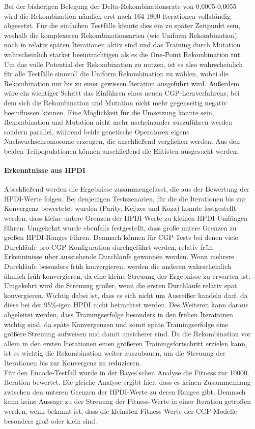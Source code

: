 Bei der bisherigen Belegung der Delta-Rekombinationsrate von 0,0005-0,0055 wird die Rekombination nämlich erst nach 164-1800 Iterationen vollständig abgesetzt.
Für die einfachen Testfälle könnte dies ein zu später Zeitpunkt sein, weshalb die komplexeren Rekombinationsarten (wie Uniform Rekombination) noch in relativ späten Iterationen aktiv sind und das Training durch Mutation wahrscheinlich stärker beeinträchtigen als es die One-Point Rekombination tut.
Um das volle Potential der Rekombination zu nutzen, ist es also wahrscheinlich für alle Testfälle sinnvoll die Uniform Rekombination zu wählen, wobei die Rekombination nur bis zu einer gewissen Iteration ausgeführt wird.
Außerdem wäre ein wichtiger Schritt das Einführen eines neuen CGP-Lernverfahrens, bei dem sich die Rekombination und Mutation nicht mehr gegenseitig negativ beeinflussen können.
Eine Möglichkeit für die Umsetzung könnte sein, Rekombination und Mutation nicht mehr nacheinander auszuführen werden sondern parallel, während beide genetische Operatoren eigene Nachwuchschromosome erzeugen, die anschließend verglichen werden.
Aus den beiden Teilpopulationen können anschließend die Elitisten ausgesucht werden.
\paragraph{Erkenntnisse aus HPDI}
Abschließend werden die Ergebnisse zusammengefasst, die aus der Bewertung der HPDI-Werte folgen.
Bei denjenigen Testszenarien, für die die Iterationen bis zur Konvergenz bewertetet wurden (Parity, Keijzer und Koza) konnte festgestellt werden, dass kleine untere Grenzen der HPDI-Werte zu kleinen HPDI-Umfängen führen.
Umgekehrt wurde ebenfalls festgestellt, dass große untere Grenzen zu großen HPDI-Ranges führen.
Demnach können für CGP-Tests bei denen viele Durchläufe pro CGP-Konfiguration durchgeführt werden, relativ früh Erkenntnisse über ausstehende Durchläufe gewonnen werden.
Wenn mehrere Durchläufe besonders früh konvergieren, werden die anderen wahrscheinlich ähnlich früh konvergieren, da eine kleine Streuung der Ergebnisse zu erwarten ist.
Umgekehrt wird die Streuung größer, wenn die ersten Durchläufe relativ spät konvergieren.
Wichtig dabei ist, dass es sich nicht um Ausreißer handeln darf, da diese bei der 95\%-igen HPDI nicht betrachtet werden.
Des Weiteren kann daraus abgeleitet werden, dass Trainingserfolge besonders in den frühen Iterationen wichtig sind, da späte Konvergenzen und somit späte Trainingserfolge eine größere Streuung aufweisen und damit unsicherer sind.
Da die Rekombination vor allem in den ersten Iterationen einen größeren Trainingsfortschritt erzielen kann, ist es wichtig die Rekombination weiter auszubauen, um die Streuung der Iterationen bis zur Konvergenz zu reduzieren.\\
Für den Encode-Testfall wurde in der Bayes'schen Analyse die Fitness zur 10000. Iteration bewertet.
Die gleiche Analyse ergibt hier, dass es keinen Zusammenhang zwischen den unteren Grenzen der HPDI-Werte zu deren Ranges gibt.
Demnach kann keine Aussage zu der Streuung der Fitness-Werte in einer Iteration getroffen werden, wenn bekannt ist, dass die kleinsten Fitness-Werte der CGP-Modelle besonders groß oder klein sind.

